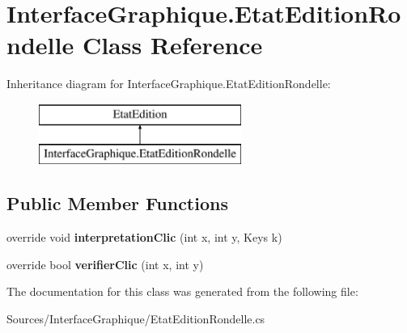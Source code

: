 \hypertarget{class_interface_graphique_1_1_etat_edition_rondelle}{}\section{Interface\+Graphique.\+Etat\+Edition\+Rondelle Class Reference}
\label{class_interface_graphique_1_1_etat_edition_rondelle}
Inheritance diagram for Interface\+Graphique.\+Etat\+Edition\+Rondelle\+:\begin{figure}[H]
\begin{center}
\leavevmode
\includegraphics[height=2.000000cm]{class_interface_graphique_1_1_etat_edition_rondelle}
\end{center}
\end{figure}
\subsection*{Public Member Functions}
\begin{DoxyCompactItemize}
\item 
\hypertarget{class_interface_graphique_1_1_etat_edition_rondelle_a33e725c3e9db6f9c822bbe75ab9328c5}{}\label{class_interface_graphique_1_1_etat_edition_rondelle_a33e725c3e9db6f9c822bbe75ab9328c5} 
override void {\bfseries interpretation\+Clic} (int x, int y, Keys k)
\item 
\hypertarget{class_interface_graphique_1_1_etat_edition_rondelle_ab7559d67e73d6055184a503025ea7456}{}\label{class_interface_graphique_1_1_etat_edition_rondelle_ab7559d67e73d6055184a503025ea7456} 
override bool {\bfseries verifier\+Clic} (int x, int y)
\end{DoxyCompactItemize}


The documentation for this class was generated from the following file\+:\begin{DoxyCompactItemize}
\item 
Sources/\+Interface\+Graphique/Etat\+Edition\+Rondelle.\+cs\end{DoxyCompactItemize}
